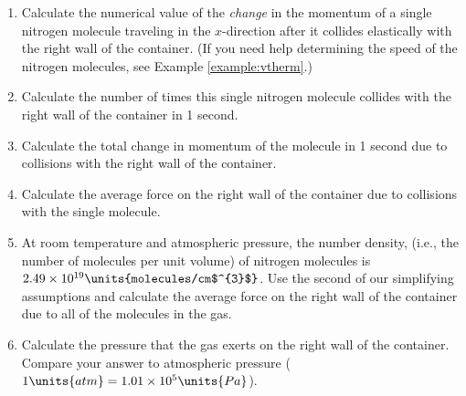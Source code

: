 \begin{problem}
  \begin{enumerate}
  \item Calculate the numerical value of the {\em change} in the momentum of 
  a single nitrogen molecule traveling in the $x$-direction after it 
  collides elastically with the right wall of the container.  (If you 
  need help determining the speed of the nitrogen molecules, see Example
  \ref{example:vtherm}.)
  \item Calculate the number of times this single nitrogen molecule 
  collides with the right wall of the container in 1 second.
  \item Calculate the total change in momentum of the molecule in 1 second
  due to collisions with the right wall of the container.
  \item Calculate the average force on the right wall of the container 
  due to collisions with the single molecule.
  \item At room temperature and atmospheric pressure, the number density, 
  (i.e., the number of molecules per unit volume) of 
  nitrogen molecules is $2.49\times 10^{19}\units{molecules/cm$^{3}$}$.  
  Use the second of our simplifying assumptions and calculate the 
  average force on the right wall of the container due to all of the 
  molecules in the gas. 
  \item Calculate the pressure that the gas exerts on the right wall
  of the container.  Compare your answer to atmospheric pressure 
  ($1\units{atm} = 1.01\times 10^5\units{Pa}$). 
  \end{enumerate}
  \label{problem:ideal_gas_quant}
\end{problem}
